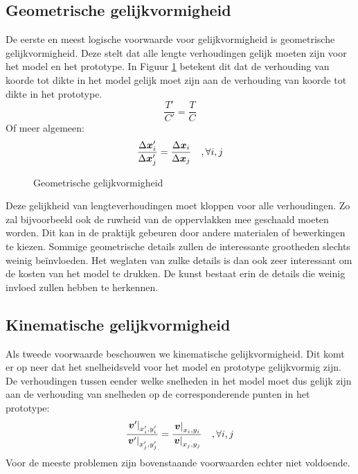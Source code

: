 		\subsection{Geometrische gelijkvormigheid}
De eerste en meest logische voorwaarde voor gelijkvormigheid is geometrische gelijkvormigheid. Deze stelt dat alle lengte verhoudingen gelijk moeten zijn voor het model en het prototype. In Figuur \ref{fig:geometrische gelijkvormigheid} betekent dit dat de verhouding van koorde tot dikte in het model gelijk moet zijn aan de verhouding van koorde tot dikte in het prototype.
\begin{equation}
	\dfrac{T'}{C'} = \dfrac{T}{C}
	\label{eqn:geometrische gelijkvormigheid vleugel}
\end{equation}
Of meer algemeen:
\begin{equation}
	\dfrac{\Delta \boldsymbol{x}_i'}{\Delta \boldsymbol{x}_j'} = \dfrac{\Delta \boldsymbol{x}_i}{\Delta \boldsymbol{x}_j} \quad, \forall i,j
	\label{eqn:geometrische gelijkvormigheid}
\end{equation}
\begin{figure}[htb]
	\centering
	
	\caption{Geometrische gelijkvormigheid}
	\label{fig:geometrische gelijkvormigheid}
\end{figure}
Deze gelijkheid van lengteverhoudingen moet kloppen voor alle verhoudingen. Zo zal bijvoorbeeld ook de ruwheid van de oppervlakken mee geschaald moeten worden. Dit kan in de praktijk gebeuren door andere materialen of bewerkingen te kiezen. Sommige geometrische details zullen de interessante grootheden slechts weinig beïnvloeden. Het weglaten van zulke details is dan ook zeer interessant om de kosten van het model te drukken. De kunst bestaat erin de details die weinig invloed zullen hebben te herkennen.
	\subsection{Kinematische gelijkvormigheid}
Als tweede voorwaarde beschouwen we kinematische gelijkvormigheid. Dit komt er op neer dat het snelheidsveld voor het model en prototype gelijkvormig zijn. De verhoudingen tussen eender welke snelheden in het model moet dus gelijk zijn aan de verhouding van snelheden op de corresponderende punten in het prototype:
\begin{equation}
	\dfrac{\left. \boldsymbol{v}' \right|_{x_i',y_i'}}{\left. \boldsymbol{v}' \right|_{x_j',y_j'}} = \dfrac{\left. \boldsymbol{v} \right|_{x_i,y_i}}{\left. \boldsymbol{v} \right|_{x_j,y_j}} \quad, \forall i,j
	\label{eqn:kinematische gelijkvormigheid}
\end{equation}
Voor de meeste problemen zijn bovenstaande voorwaarden echter niet voldoende.
